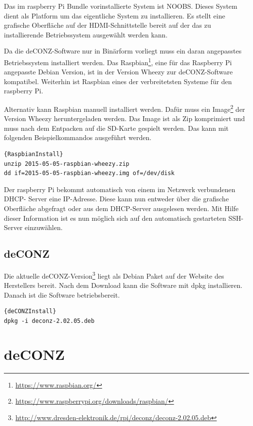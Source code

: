 \documentclass[a4paper,12pt]{article}
\begin{document}
Das im raspberry Pi Bundle vorinstallierte System ist NOOBS. Dieses System dient
als Platform um das eigentliche System zu installieren. Es stellt eine grafische
Oberfläche auf der HDMI-Schnittstelle bereit auf der das zu installierende
Betriebssystem ausgewählt werden kann.

Da die deCONZ-Software nur in Binärform vorliegt muss ein daran angepasstes
Betriebssystem installiert werden. Das Raspbian\footnote{\url{https://www.raspbian.org/}},
eine für das Raspberry Pi angepasste Debian Version, ist in der Version Wheezy
zur deCONZ-Software kompatibel. Weiterhin ist Raspbian eines der verbreitetsten
Systeme für den raspberry Pi.

Alternativ kann Raspbian manuell installiert werden. Dafür muss ein
Image\footnote{\url{https://www.raspberrypi.org/downloads/raspbian/}} der
Version Wheezy heruntergeladen werden. Das Image ist als Zip komprimiert und
muss nach dem Entpacken auf die SD-Karte gespielt werden. Das kann mit folgenden
Beispielkommandos ausgeführt werden.

\begin{lstlisting}[caption=Raspbian manuell installieren]{RaspbianInstall}
unzip 2015-05-05-raspbian-wheezy.zip
dd if=2015-05-05-raspbian-wheezy.img of=/dev/disk
\end{lstlisting}

Der raspberry Pi bekommt automatisch von einem im Netzwerk verbundenen DHCP-
Server eine IP-Adresse. Diese kann nun entweder über die grafische Oberfläche
abgefragt oder aus dem DHCP-Server ausgelesen werden. Mit Hilfe dieser
Information ist es nun möglich sich auf den automatisch gestarteten SSH-Server
einzuwählen.

\subsection{deCONZ}

Die aktuelle deCONZ-Version\footnote{\url{http://www.dresden-elektronik.de/rpi/deconz/deconz-2.02.05.deb}}
liegt als Debian Paket auf der Website des Herstellers bereit. Nach dem Download
kann die Software mit dpkg installieren. Danach ist die Software betriebsbereit.

\begin{lstlisting}[caption=deCONZ installieren]{deCONZInstall}
dpkg -i deconz-2.02.05.deb
\end{lstlisting}

\section{deCONZ}
\end{document}

